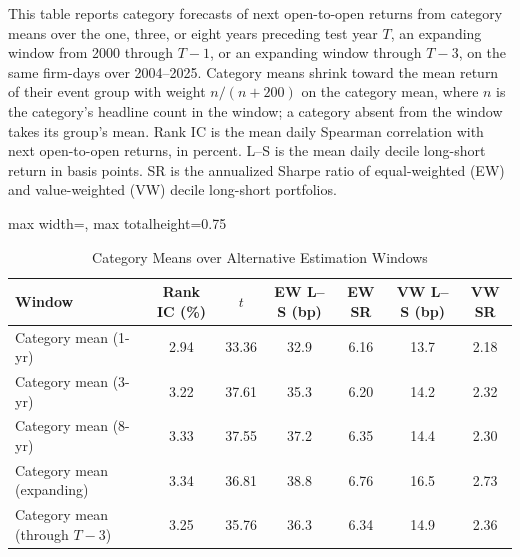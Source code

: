 \begin{table}[htbp]
\centering
\caption{Category Means over Alternative Estimation Windows}
\label{tab:tabA_windows}
\begin{minipage}{\linewidth}\footnotesize
This table reports category forecasts of next open-to-open returns from category means over the one, three, or eight years preceding test year $T$, an expanding window from 2000 through $T-1$, or an expanding window through $T-3$, on the same firm-days over 2004--2025. Category means shrink toward the mean return of their event group with weight $n/(n+200)$ on the category mean, where $n$ is the category's headline count in the window; a category absent from the window takes its group's mean. Rank IC is the mean daily Spearman correlation with next open-to-open returns, in percent. L--S is the mean daily decile long-short return in basis points. SR is the annualized Sharpe ratio of equal-weighted (EW) and value-weighted (VW) decile long-short portfolios.
\end{minipage}
\medskip

{\footnotesize
\begin{adjustbox}{max width=\linewidth, max totalheight=0.75\textheight}
\begin{tabular}{lcccccc}
\toprule
Window & Rank IC (\%) & $t$ & EW L--S (bp) & EW SR & VW L--S (bp) & VW SR \\
\midrule
Category mean (1-yr) & 2.94 & 33.36 & 32.9 & 6.16 & 13.7 & 2.18 \\
Category mean (3-yr) & 3.22 & 37.61 & 35.3 & 6.20 & 14.2 & 2.32 \\
Category mean (8-yr) & 3.33 & 37.55 & 37.2 & 6.35 & 14.4 & 2.30 \\
Category mean (expanding) & 3.34 & 36.81 & 38.8 & 6.76 & 16.5 & 2.73 \\
Category mean (through $T-3$) & 3.25 & 35.76 & 36.3 & 6.34 & 14.9 & 2.36 \\
\bottomrule
\end{tabular}
\end{adjustbox}
}
\end{table}

